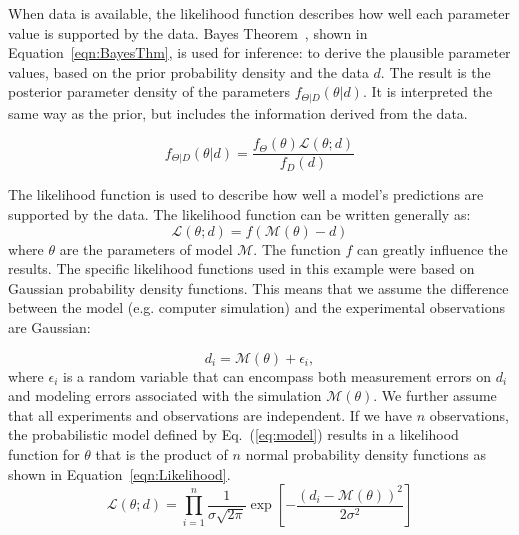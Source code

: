 When data is available, the likelihood function describes how well 
each parameter value is supported by the data. Bayes Theorem~\cite{Jaynes}, 
shown in Equation~\ref{eqn:BayesThm}, is used for inference:  to 
derive the plausible parameter values, based on the prior probability 
density and the data $d$. The result is the posterior parameter density 
of the parameters $f_{\Theta |D}\left( {\theta |d} \right)$. It is 
interpreted the same way as the prior, but includes the information 
derived from the data.
 
\begin{equation}
  \label{eqn:BayesThm}
  {f_{\Theta |D}}\left( {\theta |d} \right) = \frac{{{f_\Theta }\left( \theta  \right)\mathcal{L}\left( {\theta ;d} \right)}}{{{f_D}\left( d \right)}}
\end{equation}

The likelihood function is used to describe how well a model's 
predictions are supported by the data. 
The likelihood function can be written generally as:
\begin{equation*}
  \mathcal{L}\left( {\theta ;d} \right) = f\left( {\mathcal{M}\left( \theta  \right) - d} \right)
\end{equation*}
where $\theta$ are the parameters of model $\mathcal{M}$. 
The function $f$ can greatly influence the results. 
The specific likelihood functions used in this example were based on 
Gaussian probability density functions. This means that we assume 
the difference between the model (e.g. computer simulation)
and the experimental observations are Gaussian: 

\begin{equation}\label{eq:model}
d_i = \mathcal{M}(\theta) + \epsilon_i,
\end{equation}
where $\epsilon_i$ is a random variable that can encompass both
measurement errors on $d_i$ and modeling errors associated with the
simulation $\mathcal{M}(\theta)$. We further 
assume that all experiments and observations are independent. 
If we have $n$ observations,  
the probabilistic model defined by Eq.~(\ref{eq:model}) results in a
likelihood function for $\theta$ that is the product of $n$ normal
probability density functions
as shown in Equation~\ref{eqn:Likelihood}.
\begin{equation}\label{eqn:Likelihood}  
\mathcal{L}({\theta};d) = \prod_{i=1}^n
\frac{1}{\sigma \sqrt{2\pi}} \exp
\left[ - \frac{\left(d_i-\mathcal{M}({\theta})\right)^2}{2\sigma^2} \right]
\end{equation}


